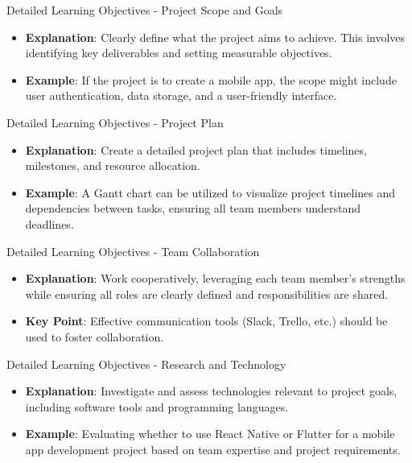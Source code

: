 \documentclass[aspectratio=169]{beamer}
\begin{document}
\begin{frame}[fragile]{Detailed Learning Objectives - Project Scope and Goals}
  \begin{itemize}
    \item \textbf{Explanation}: Clearly define what the project aims to achieve. This involves identifying key deliverables and setting measurable objectives.
    \item \textbf{Example}: If the project is to create a mobile app, the scope might include user authentication, data storage, and a user-friendly interface.
  \end{itemize}
\end{frame}

\begin{frame}[fragile]{Detailed Learning Objectives - Project Plan}
  \begin{itemize}
    \item \textbf{Explanation}: Create a detailed project plan that includes timelines, milestones, and resource allocation.
    \item \textbf{Example}: A Gantt chart can be utilized to visualize project timelines and dependencies between tasks, ensuring all team members understand deadlines.
  \end{itemize}
\end{frame}

\begin{frame}[fragile]{Detailed Learning Objectives - Team Collaboration}
  \begin{itemize}
    \item \textbf{Explanation}: Work cooperatively, leveraging each team member's strengths while ensuring all roles are clearly defined and responsibilities are shared.
    \item \textbf{Key Point}: Effective communication tools (Slack, Trello, etc.) should be used to foster collaboration. 
  \end{itemize}
\end{frame}

\begin{frame}[fragile]{Detailed Learning Objectives - Research and Technology}
  \begin{itemize}
    \item \textbf{Explanation}: Investigate and assess technologies relevant to project goals, including software tools and programming languages.
    \item \textbf{Example}: Evaluating whether to use React Native or Flutter for a mobile app development project based on team expertise and project requirements.
  \end{itemize}
\end{frame}
\end{document}
